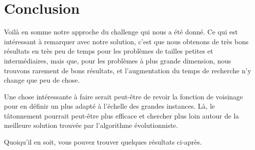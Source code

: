 \section{Conclusion}
Voilà en somme notre approche du challenge qui nous a été donné. Ce qui est intéressant à remarquer avec notre solution, c'est que nous obtenons de très bons résultats en très peu de temps pour les problèmes de tailles petites et intermédiaires, mais que, pour les problèmes à plus grande dimension, nous trouvons rarement de bons résultats, et l'augmentation du temps de recherche n'y change que peu de chose.\\

\vspace{1em}

Une chose intéressante à faire serait peut-être de revoir la fonction de voisinage pour en définir un plus adapté à l'échelle des grandes instances. Là, le tâtonnement pourrait peut-être plus efficace et chercher plus loin autour de la meilleure solution trouvée par l'algorithme évolutionniste.\\

\vspace{1em}

Quoiqu'il en soit, vous pouvez trouver quelques résultats ci-après.